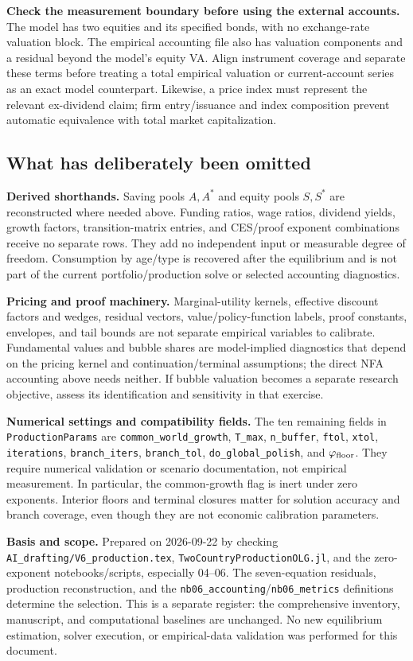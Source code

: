 \documentclass[10pt,a4paper,landscape]{article}
\newcommand{\code}[1]{{\footnotesize\texttt{#1}}}
\begin{document}
\textbf{Check the measurement boundary before using the external accounts.} The model has two equities and its specified bonds, with no exchange-rate valuation block. The empirical accounting file also has valuation components and a residual beyond the model's equity VA. Align instrument coverage and separate these terms before treating a total empirical valuation or current-account series as an exact model counterpart. Likewise, a price index must represent the relevant ex-dividend claim; firm entry/issuance and index composition prevent automatic equivalence with total market capitalization.

\subsection*{What has deliberately been omitted}

\textbf{Derived shorthands.} Saving pools $A,A^*$ and equity pools $S,S^*$ are reconstructed where needed above. Funding ratios, wage ratios, dividend yields, growth factors, transition-matrix entries, and CES/proof exponent combinations receive no separate rows. They add no independent input or measurable degree of freedom. Consumption by age/type is recovered after the equilibrium and is not part of the current portfolio/production solve or selected accounting diagnostics.

\textbf{Pricing and proof machinery.} Marginal-utility kernels, effective discount factors and wedges, residual vectors, value/policy-function labels, proof constants, envelopes, and tail bounds are not separate empirical variables to calibrate. Fundamental values and bubble shares are model-implied diagnostics that depend on the pricing kernel and continuation/terminal assumptions; the direct NFA accounting above needs neither. If bubble valuation becomes a separate research objective, assess its identification and sensitivity in that exercise.

\textbf{Numerical settings and compatibility fields.} The ten remaining fields in \code{ProductionParams} are \code{common\_world\_growth}, \code{T\_max}, \code{n\_buffer}, \code{ftol}, \code{xtol}, \code{iterations}, \code{branch\_iters}, \code{branch\_tol}, \code{do\_global\_polish}, and $\varphi_{\rm floor}$. They require numerical validation or scenario documentation, not empirical measurement. In particular, the common-growth flag is inert under zero exponents. Interior floors and terminal closures matter for solution accuracy and branch coverage, even though they are not economic calibration parameters.

\vfill
{\footnotesize\color{heading}\textbf{Basis and scope.} Prepared on 2026-09-22 by checking \code{AI\_drafting/V6\_production.tex}, \code{TwoCountryProductionOLG.jl}, and the zero-exponent notebooks/scripts, especially 04--06. The seven-equation residuals, production reconstruction, and the \code{nb06\_accounting}/\code{nb06\_metrics} definitions determine the selection. This is a separate register: the comprehensive inventory, manuscript, and computational baselines are unchanged. No new equilibrium estimation, solver execution, or empirical-data validation was performed for this document.}
\end{document}
